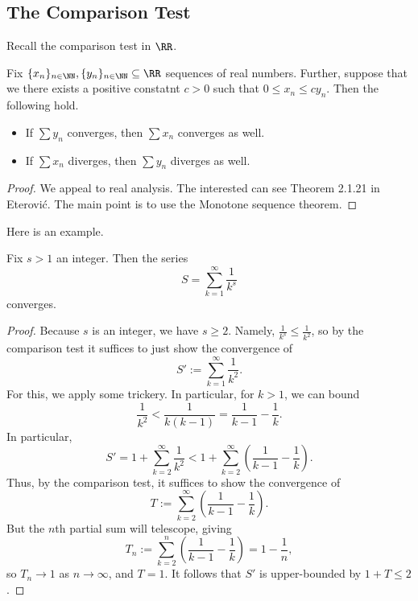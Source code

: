 \subsection{The Comparison Test}
Recall the comparison test in $\RR$.
\begin{theorem}
	Fix $\{x_n\}_{n\in\NN},\{y_n\}_{n\in\NN}\subseteq\RR$ sequences of real numbers. Further, suppose that we there exists a positive constatnt $c>0$ such that $0\le x_n\le cy_n$. Then the following hold.
	\begin{itemize}
		\item If $\sum y_n$ converges, then $\sum x_n$ converges as well.
		\item If $\sum x_n$ diverges, then $\sum y_n$ diverges as well.
	\end{itemize}
\end{theorem}
\begin{proof}
	We appeal to real analysis. The interested can see Theorem 2.1.21 in Eterovi\'c. The main point is to use the Monotone sequence theorem.
\end{proof}
Here is an example.
\begin{exe}
	Fix $s>1$ an integer. Then the series
	\[S=\sum_{k=1}^\infty\frac1{k^s}\]
	converges.
\end{exe}
\begin{proof}
	Because $s$ is an integer, we have $s\ge2$. Namely, $\frac1{k^s}\le\frac1{k^2}$, so by the comparison test it suffices to just show the convergence of
	\[S':=\sum_{k=1}^\infty\frac1{k^2}.\]
	For this, we apply some trickery. In particular, for $k>1$, we can bound
	\[\frac1{k^2}<\frac1{k(k-1)}=\frac1{k-1}-\frac1k.\]
	In particular,
	\[S'=1+\sum_{k=2}^\infty\frac1{k^2}<1+\sum_{k=2}^\infty\left(\frac1{k-1}-\frac1k\right).\]
	Thus, by the comparison test, it suffices to show the convergence of
	\[T:=\sum_{k=2}^\infty\left(\frac1{k-1}-\frac1k\right).\]
	But the $n$th partial sum will telescope, giving
	\[T_n:=\sum_{k=2}^n\left(\frac1{k-1}-\frac1k\right)=1-\frac1n,\]
	so $T_n\to1$ as $n\to\infty$, and $T=1$. It follows that $S'$ is upper-bounded by $1+T\le2$.
\end{proof}

